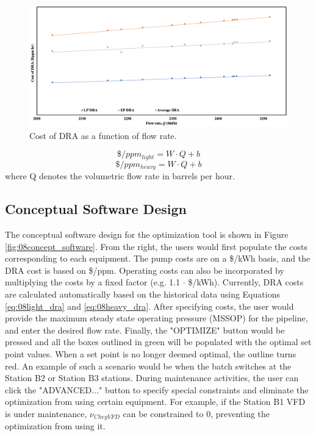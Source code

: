 \begin{figure}[h]
    \centering
    \includegraphics[width=\textwidth]{images/suncor/08DRA_Cost.png}
    \caption{Cost of DRA as a function of flow rate.}
    \label{fig:08DRA_Cost}
\end{figure}

\begin{equation}
    \$ / ppm_{light} = W \cdot Q + b
    \label{eq:08light_dra}
\end{equation}
\begin{equation}
    \$ / ppm_{heavy} = W \cdot Q + b
    \label{eq:08heavy_dra}
\end{equation}
where Q denotes the volumetric flow rate in barrels per hour.

\subsection{Conceptual Software Design}
The conceptual software design for the optimization tool is shown in Figure \ref{fig:08concept_software}. From the right, the users would first populate the costs corresponding to each equipment.  The pump costs are on a \$/kWh basis, and the DRA cost is based on \$/ppm. Operating costs can also be incorporated by multiplying the costs by a fixed factor (e.g. 1.1 $\cdot$ \$/kWh). Currently, DRA costs are calculated automatically based on the historical data using Equations \ref{eq:08light_dra} and \ref{eq:08heavy_dra}. After specifying costs, the user would provide the maximum steady state operating pressure (MSSOP) for the pipeline, and enter the desired flow rate.  Finally, the "OPTIMIZE" button would be pressed and all the boxes outlined in green will be populated with the optimal set point values.  When a set point is no longer deemed optimal, the outline turns red.  An example of such a scenario would be when the batch switches at the Station B2 or Station B3 stations.  During maintenance activities, the user can click the "ADVANCED..." button to specify special constraints and eliminate the optimization from using certain equipment. For example, if the Station B1 VFD is under maintenance, $\nu_{Chey VFD}$ can be constrained to 0, preventing the optimization from using it.

